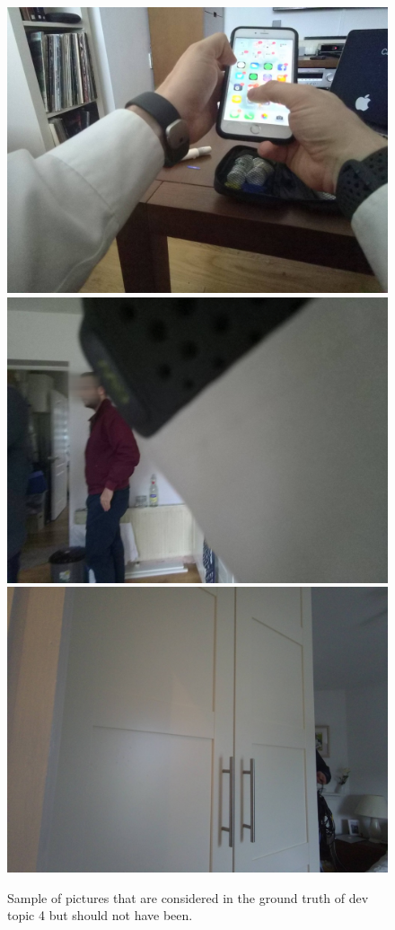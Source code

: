  
    \begin{figure}[H]
        \centering
        \captionsetup{justification=centering}
        \includegraphics[width=.32\linewidth]{Sections/5ImageClef/images/2_gt.jpg}
        \includegraphics[width=.32\linewidth]{Sections/5ImageClef/images/3_gt.jpg}
        \includegraphics[width=.32\linewidth]{Sections/5ImageClef/images/4_gt.jpg}
        \caption[Picture that should not belong in the ground truth]{Sample of pictures that are considered in the ground truth of dev topic 4 but should not have been.}
        \label{fig:bad}
        \end{figure}


  

